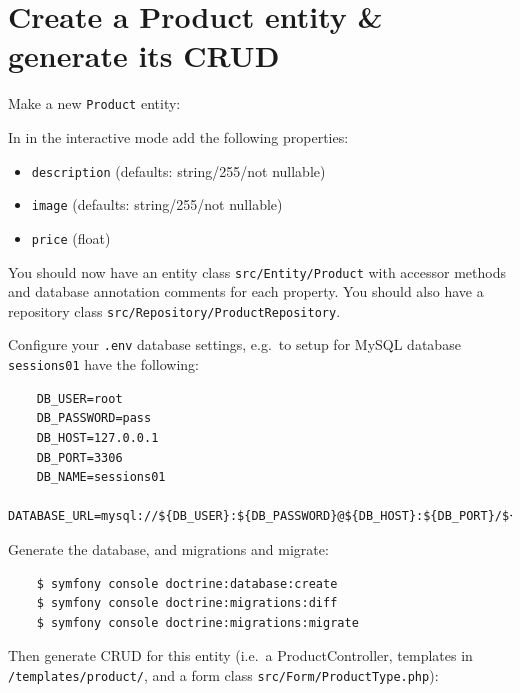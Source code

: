 \documentclass[a4paperpaper,openright]{book}
\newenvironment{Shaded}{}{}
\newcommand{\ExtensionTok}[1]{#1}
\newcommand{\NormalTok}[1]{#1}
\providecommand{\tightlist}{%
  \setlength{\itemsep}{0pt}\setlength{\parskip}{0pt}}
\begin{document}
\hypertarget{create-a-product-entity-generate-its-crud}{%
\section{Create a Product entity \& generate its
CRUD}\label{create-a-product-entity-generate-its-crud}}

Make a new \texttt{Product} entity:

\begin{Shaded}
\end{Shaded}

In in the interactive mode add the following properties:

\begin{itemize}
\tightlist
\item
  \texttt{description} (defaults: string/255/not nullable)
\item
  \texttt{image} (defaults: string/255/not nullable)
\item
  \texttt{price} (float)
\end{itemize}

You should now have an entity class \texttt{src/Entity/Product} with
accessor methods and database annotation comments for each property. You
should also have a repository class
\texttt{src/Repository/ProductRepository}.

Configure your \texttt{.env} database settings, e.g.~to setup for MySQL
database \texttt{sessions01} have the following:

\begin{verbatim}
    DB_USER=root
    DB_PASSWORD=pass
    DB_HOST=127.0.0.1
    DB_PORT=3306
    DB_NAME=sessions01
    DATABASE_URL=mysql://${DB_USER}:${DB_PASSWORD}@${DB_HOST}:${DB_PORT}/${DB_NAME}
\end{verbatim}

Generate the database, and migrations and migrate:

\begin{verbatim}
    $ symfony console doctrine:database:create
    $ symfony console doctrine:migrations:diff
    $ symfony console doctrine:migrations:migrate
\end{verbatim}

Then generate CRUD for this entity (i.e.~a ProductController, templates
in \texttt{/templates/product/}, and a form class
\texttt{src/Form/ProductType.php}):
\end{document}
